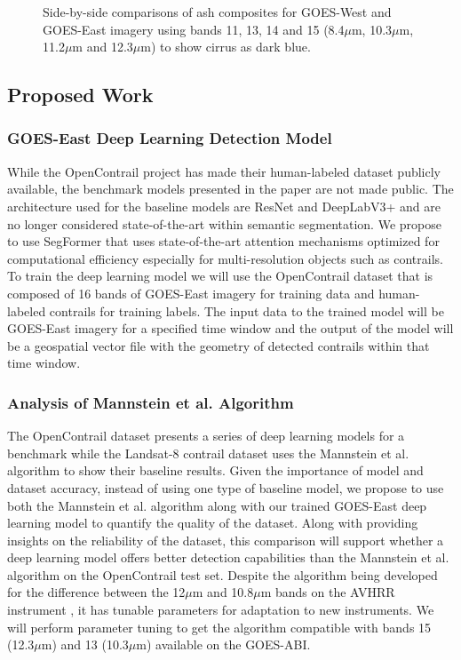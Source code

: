 \begin{figure}
\caption{Side-by-side comparisons of ash composites for GOES-West and GOES-East imagery using bands 11, 13, 14 and 15 (8.4\(\mu\)m, 10.3\(\mu\)m, 11.2\(\mu\)m and 12.3\(\mu\)m) to show cirrus as dark blue.}
\label{goes_img}
\end{figure}

\subsection{Proposed Work}

\subsubsection{GOES-East Deep Learning Detection Model}
While the OpenContrail project has made their human-labeled dataset publicly available, the benchmark models presented in the paper \cite{opencontrails} are not made public. The architecture used for the \cite{opencontrails} baseline models are ResNet \cite{resnet} and DeepLabV3+ \cite{deeplab} and are no longer considered state-of-the-art within semantic segmentation. We propose to use SegFormer \cite{segformer} that uses state-of-the-art attention mechanisms optimized for computational efficiency especially for multi-resolution objects such as contrails. To train the deep learning model we will use the OpenContrail dataset that is composed of 16 bands of GOES-East imagery for training data and human-labeled contrails for training labels. The input data to the trained model will be GOES-East imagery for a specified time window and the output of the model will be a geospatial vector file with the geometry of detected contrails within that time window.

\subsubsection{Analysis of Mannstein et al. Algorithm}

The OpenContrail dataset \cite{opencontrails} presents a series of deep learning models for a benchmark while the Landsat-8 contrail dataset \cite{landsat} uses the Mannstein et al. algorithm to show their baseline results. Given the importance of model and dataset accuracy, instead of using one type of baseline model, we propose to use both the Mannstein et al. algorithm along with our trained GOES-East deep learning model to quantify the quality of the dataset. Along with providing insights on the reliability of the dataset, this comparison will support whether a deep learning model offers better detection capabilities than the Mannstein et al. algorithm on the OpenContrail test set. Despite the algorithm being developed for the difference between the 12\(\mu\)m and 10.8\(\mu\)m bands on the AVHRR instrument \cite{mannstein}, it has tunable parameters for adaptation to new instruments. We will perform parameter tuning to get the algorithm compatible with bands 15 (12.3\(\mu\)m) and 13 (10.3\(\mu\)m) available on the GOES-ABI.

